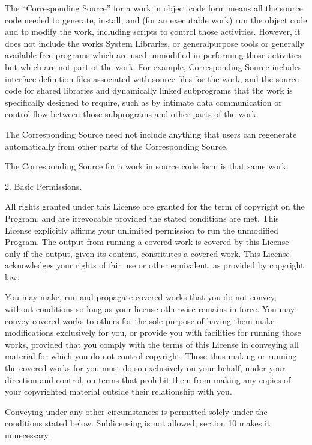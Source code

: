 \documentclass[letterpaper,10pt,english]{sphinxmanual}
\begin{document}
\begin{sphinxVerbatim}[commandchars=\\\{\}]
   The “Corresponding Source” for a work in object code form means all the
   source code needed to generate, install, and (for an executable work) run
   the object code and to modify the work, including scripts to control those
   activities. However, it does not include the work\PYGZsq{}s System Libraries, or
   general\PYGZhy{}purpose tools or generally available free programs which are used
   unmodified in performing those activities but which are not part of the
   work. For example, Corresponding Source includes interface definition files
   associated with source files for the work, and the source code for shared
   libraries and dynamically linked subprograms that the work is specifically
   designed to require, such as by intimate data communication or control flow
   between those subprograms and other parts of the work.

   The Corresponding Source need not include anything that users can regenerate
   automatically from other parts of the Corresponding Source.

   The Corresponding Source for a work in source code form is that same work.

 2. Basic Permissions.

   All rights granted under this License are granted for the term of copyright
   on the Program, and are irrevocable provided the stated conditions are
   met. This License explicitly affirms your unlimited permission to run the
   unmodified Program. The output from running a covered work is covered by
   this License only if the output, given its content, constitutes a covered
   work. This License acknowledges your rights of fair use or other equivalent,
   as provided by copyright law.

   You may make, run and propagate covered works that you do not convey,
   without conditions so long as your license otherwise remains in force. You
   may convey covered works to others for the sole purpose of having them make
   modifications exclusively for you, or provide you with facilities for
   running those works, provided that you comply with the terms of this License
   in conveying all material for which you do not control copyright. Those thus
   making or running the covered works for you must do so exclusively on your
   behalf, under your direction and control, on terms that prohibit them from
   making any copies of your copyrighted material outside their relationship
   with you.

   Conveying under any other circumstances is permitted solely under the
   conditions stated below. Sublicensing is not allowed; section 10 makes it
   unnecessary.


\end{sphinxVerbatim}
\end{document}
